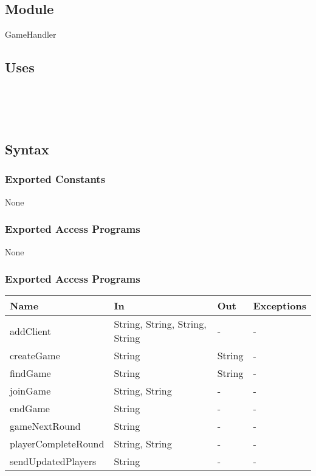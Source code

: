 \documentclass[12pt, titlepage]{article}
\begin{document}
\subsection{Module}

GameHandler

\subsection{Uses}

\\
\\
\\

\subsection{Syntax}


\subsubsection{Exported Constants}
None

\subsubsection{Exported Access Programs}
None

\subsubsection{Exported Access Programs}

\begin{center}
\begin{tabular}{| p{5cm} | p{4cm} | p{4cm} | p{2.25cm} |}
\hline
\textbf{Name} & \textbf{In} & \textbf{Out} & \textbf{Exceptions} \\
\hline
addClient & String, String, String, String & - & - \\
\hline
createGame & String & String & - \\
\hline
findGame & String & String & - \\
\hline
joinGame & String, String & - & - \\
\hline
endGame & String & - & - \\
\hline
gameNextRound & String & - & - \\
\hline
playerCompleteRound & String, String & - & - \\
\hline
sendUpdatedPlayers &  String & - & - \\
\hline


\end{tabular}
\end{center}
\end{document}
